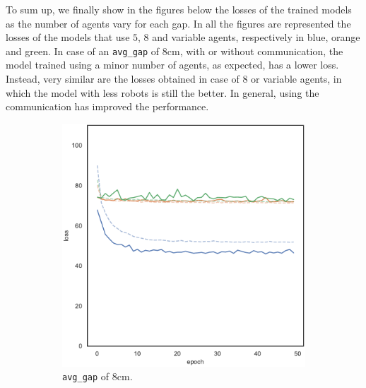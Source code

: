 To sum up, we finally show in the figures below the losses of the trained 
models as the number of agents vary for each gap. In all the figures are 
represented the losses of the models that use $5$, $8$ and variable agents, 
respectively in blue, orange and green.
In case of an \texttt{avg\_gap} of $8$\gls{cm}, with or without communication, 
the model trained using a minor number of agents, as expected, has a lower loss.
Instead, very similar are the losses obtained in case of $8$ or variable agents, in 
which the model with less robots is still the better.
In general, using the communication has improved the performance.

\begin{figure}[!htb]
	\begin{center}
		\begin{subfigure}[h]{0.32\textwidth}
			\includegraphics[width=\textwidth]{contents/images/task1-comm-extension/loss-distributed-gap_8@copy}
			\caption{\texttt{avg\_gap} of $8$\gls{cm}.}
		\end{subfigure}
		\hfill
		\begin{subfigure}[h]{0.32\textwidth}

\end{subfigure}
\end{center}
\end{figure}
